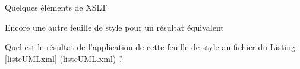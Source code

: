 \begin{frame}{Quelques \'el\'ements de XSLT}
\framebreak

Encore une autre feuille de style pour un r\'esultat \'equivalent\\

\begin{center}
\begin{minipage}{\textwidth}

\end{minipage}
\end{center}

\begin{exoblock}
Quel est le r\'esultat de l'application de cette feuille de style au fichier du Listing \ref{listeUMLxml} (listeUML.xml) ? 
\end{exoblock}


\end{frame}


